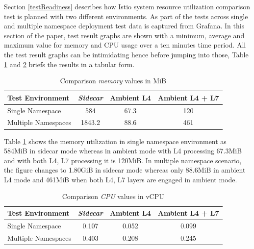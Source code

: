 Section \ref{testReadiness} describes how Istio system resource utilization comparison test is planned with two different environments. As part of the tests across single and multiple namespace deployment test data is captured from Grafana. In this section of the paper, test result graphs are shown with a minimum, average and maximum value for memory and CPU usage over a ten minutes time period. All the test result graphs can be intimidating hence before jumping into those, Table \ref{memoryUsageTable} and \ref{cpuUsageTable} briefs the results in a tabular form.

\begin{table}[ht!]
  \centering
  \begin{tabular}{ |l|c|c|c|}
    \hline
    \textbf{Test Environment} & \textbf{\textit{Sidecar}} & \textbf{Ambient L4} & \textbf{Ambient L4 + L7} \\ \hline
    Single Namespace & 584 & 67.3 & 120 \\ \hline
    Multiple Namespaces & 1843.2 & 88.6 & 461 \\ \hline 
  \end{tabular}
  \caption{Comparison \textit{memory} values in MiB}
  \label{memoryUsageTable}
\end{table}

Table \ref{memoryUsageTable} shows the memory utilization in single namespace environment as 584MiB in sidecar mode whereas in ambient mode with L4 processing 67.3MiB and with both L4, L7 processing it is 120MiB. In multiple namespace scenario, the figure changes to 1.80GiB in sidecar mode whereas only 88.6MiB in ambient L4 mode and 461MiB when both L4, L7 layers are engaged in ambient mode.

\begin{table}[ht!]
  \centering
  \begin{tabular}{ |l|c|c|c|}
    \hline
    \textbf{Test Environment} & \textbf{\textit{Sidecar}} & \textbf{Ambient L4} & \textbf{Ambient L4 + L7} \\ \hline
    Single Namespace & 0.107 & 0.052 & 0.099 \\ \hline
    Multiple Namespaces & 0.403 & 0.208 & 0.245 \\ \hline
  \end{tabular}
  \caption{Comparison \textit{CPU} values in vCPU}
  \label{cpuUsageTable}
\end{table}

